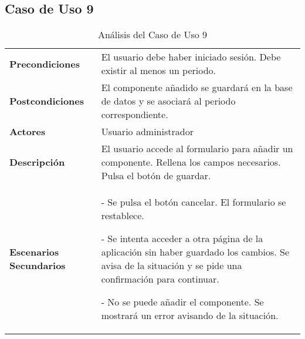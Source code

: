 \subsection{Caso de Uso 9}
\begin{table}[H]
  \centering
  \vspace{-5mm}
  \caption{Análisis del Caso de Uso 9}
    \begin{tabular}{p{7.5em}p{24.145em}}
    \toprule
    \rowcolor[rgb]{ .871,  .918,  .965} \multicolumn{2}{p{31.645em}}{\textbf{Añadir componente}} \\
    \midrule
    \rowcolor[rgb]{ .906,  .902,  .902} \textbf{Precondiciones} & \cellcolor[rgb]{ 1,  1,  1}El usuario debe haber iniciado sesión. Debe existir al menos un periodo. \\
    \midrule
    \rowcolor[rgb]{ .906,  .902,  .902} \textbf{Postcondiciones} & \cellcolor[rgb]{ 1,  1,  1}El componente añadido se guardará en la base de datos y se asociará al periodo correspondiente. \\
    \midrule
    \rowcolor[rgb]{ .906,  .902,  .902} \textbf{Actores} & \cellcolor[rgb]{ 1,  1,  1}Usuario administrador \\
    \midrule
    \rowcolor[rgb]{ .906,  .902,  .902} \textbf{Descripción} & \cellcolor[rgb]{ 1,  1,  1}El usuario accede al formulario para añadir un componente. Rellena los campos necesarios. Pulsa el botón de guardar. \\
    \midrule
    \rowcolor[rgb]{ .906,  .902,  .902} \textbf{Escenarios          Secundarios} & \cellcolor[rgb]{ 1,  1,  1}- Se pulsa el botón cancelar. El formulario se restablece.\par - Se intenta acceder a otra página de la aplicación sin haber guardado los cambios. Se avisa de la situación y se pide una confirmación para continuar.\par - No se puede añadir el componente. Se mostrará un error avisando de la situación.  \\
    \bottomrule
    \end{tabular}%
\end{table}%
 
